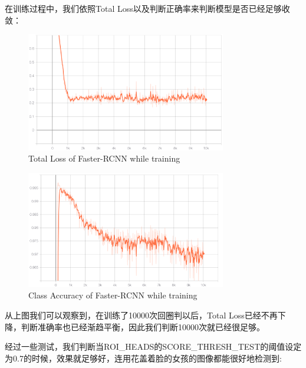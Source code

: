 \documentclass[journal,transmag]{IEEEtran}
\begin{document}
在训练过程中，我们依照Total Loss以及判断正确率来判断模型是否已经足够收敛：
\begin{figure}[h]
\centering
\includegraphics[width=3.44in]{bloss.png}
\caption{Total Loss of Faster-RCNN while training}
\end{figure}

\begin{figure}[h]
\centering
\includegraphics[width=3.44in]{bacc.png}
\caption{Class Accuracy of Faster-RCNN while training}
\end{figure}

从上图我们可以观察到，在训练了10000次回圈判以后，Total Loss已经不再下降，判断准确率也已经渐趋平衡，因此我们判断10000次就已经很足够。

经过一些测试，我们判断当ROI\_HEADS的SCORE\_THRESH\_TEST的阈值设定为0.7的时候，效果就足够好，连用花盖着脸的女孩的图像都能很好地检测到:
\end{document}

